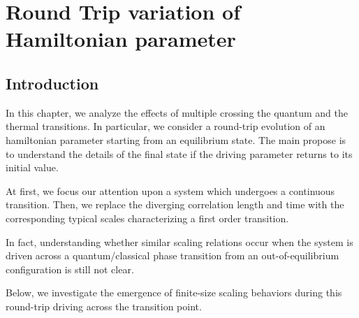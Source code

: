 \chapter{Round Trip variation of Hamiltonian parameter}
\label{chp_round}

\section{Introduction}

In this chapter, we analyze the effects of multiple
crossing the quantum and the thermal transitions. In particular,
we consider a round-trip evolution of an hamiltonian parameter
starting from an equilibrium state. The main propose is to
understand the details of the final state if the driving
parameter returns to its initial value.

At first, we focus our attention upon a system which undergoes
a continuous transition. Then, we replace the diverging correlation
length and time with the corresponding typical scales 
characterizing a first order transition.

In fact,
understanding whether similar scaling relations occur when
the system is driven across a quantum/classical phase transition
from an out-of-equilibrium configuration is still not clear.

Below,
we investigate the emergence of finite-size scaling behaviors
during this round-trip driving across the transition point.








